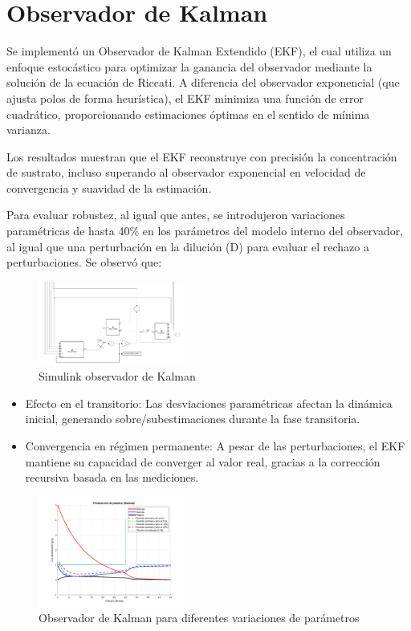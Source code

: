 \documentclass[letterpaper, 10 pt, conference]{ieeeconf}  %
\begin{document}
\section{Observador de Kalman}

Se implementó un Observador de Kalman Extendido (EKF), el cual utiliza un enfoque estocástico para optimizar la ganancia del observador mediante la solución de la ecuación de Riccati. A diferencia del observador exponencial (que ajusta polos de forma heurística), el EKF minimiza una función de error cuadrático, proporcionando estimaciones óptimas en el sentido de mínima varianza.

Los resultados muestran que el EKF reconstruye con precisión la concentración de sustrato, incluso superando al observador exponencial en velocidad de convergencia y suavidad de la estimación.

Para evaluar robustez, al igual que antes, se introdujeron variaciones paramétricas de hasta 40\% en los parámetros del modelo interno del observador, al igual que una perturbación en la dilución (D) para evaluar el rechazo a perturbaciones. Se observó que:

\begin{figure}[H]
  \centering
  \includegraphics[width=0.43\textwidth]{./Images_tp2/simulink_kalman.png}
  \caption{Simulink observador de Kalman}
\end{figure}

\begin{itemize}
  \item{Efecto en el transitorio: Las desviaciones paramétricas afectan la dinámica inicial, generando sobre/subestimaciones durante la fase transitoria.}
  \item{Convergencia en régimen permanente: A pesar de las perturbaciones, el EKF mantiene su capacidad de converger al valor real, gracias a la corrección recursiva basada en las mediciones.}
\end{itemize}

\begin{figure}[H]
  \centering
  \includegraphics[width=0.43\textwidth]{./Images_tp2/kalman.png}
  \caption{Observador de Kalman para diferentes variaciones de parámetros}
\end{figure}
\end{document}
